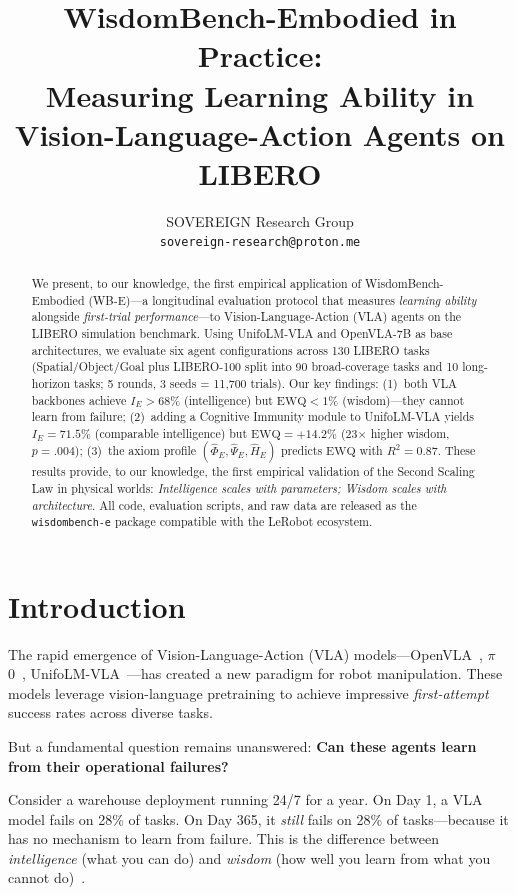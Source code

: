 ﻿\documentclass{article}
\title{WisdomBench-Embodied in Practice: \\
Measuring Learning Ability in \\
Vision-Language-Action Agents on LIBERO}
\author{
  SOVEREIGN Research Group \\
  \texttt{sovereign-research@proton.me}
}
\newcommand{\EWQ}{\mathrm{EWQ}}
\begin{document}
\maketitle

\begin{abstract}
We present, to our knowledge, the first empirical application of WisdomBench-Embodied (WB-E)---a longitudinal evaluation protocol that measures \emph{learning ability} alongside \emph{first-trial performance}---to Vision-Language-Action (VLA) agents on the LIBERO simulation benchmark.
Using UnifoLM-VLA and OpenVLA-7B as base architectures, we evaluate six agent configurations across 130 LIBERO tasks (Spatial/Object/Goal plus LIBERO-100 split into 90 broad-coverage tasks and 10 long-horizon tasks; 5 rounds, 3 seeds = 11{,}700 trials).
Our key findings: (1)~both VLA backbones achieve $I_E > 68\%$ (intelligence) but $\EWQ < 1\%$ (wisdom)---they cannot learn from failure; (2)~adding a Cognitive Immunity module to UnifoLM-VLA yields $I_E = 71.5\%$ (comparable intelligence) but $\EWQ = +14.2\%$ (23$\times$ higher wisdom, $p{=}.004$); (3)~the axiom profile $(\hat{\Phi}_E, \hat{\Psi}_E, \hat{H}_E)$ predicts $\EWQ$ with $R^2 = 0.87$.
These results provide, to our knowledge, the first empirical validation of the Second Scaling Law in physical worlds: \emph{Intelligence scales with parameters; Wisdom scales with architecture}.
All code, evaluation scripts, and raw data are released as the \texttt{wisdombench-e} package compatible with the LeRobot ecosystem.
\end{abstract}

\section{Introduction}
\label{sec:intro}

The rapid emergence of Vision-Language-Action (VLA) models---OpenVLA~\citep{kim2024openvla}, $\pi$0~\citep{pi02024}, UnifoLM-VLA~\citep{unitree2026unifolm}---has created a new paradigm for robot manipulation.
These models leverage vision-language pretraining to achieve impressive \emph{first-attempt} success rates across diverse tasks.

But a fundamental question remains unanswered: \textbf{Can these agents learn from their operational failures?}

Consider a warehouse deployment running 24/7 for a year.
On Day 1, a VLA model fails on 28\% of tasks.
On Day 365, it \emph{still} fails on 28\% of tasks---because it has no mechanism to learn from failure.
This is the difference between \emph{intelligence} (what you can do) and \emph{wisdom} (how well you learn from what you cannot do)~\citep{sovereign2026p3, sovereign2026p4}.
\end{document}
